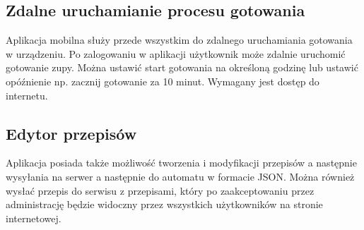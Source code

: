\documentclass[12pt,a4paper,notitlepage]{article}
\begin{document}
\subsection{Zdalne uruchamianie procesu gotowania}
Aplikacja mobilna służy przede wszystkim do zdalnego uruchamiania gotowania w urządzeniu. Po zalogowaniu w aplikacji użytkownik może zdalnie uruchomić gotowanie zupy. Można ustawić start gotowania na określoną godzinę lub ustawić opóźnienie np. zacznij gotowanie za 10 minut. Wymagany jest dostęp do internetu.
\subsection{Edytor przepisów}
Aplikacja posiada także możliwość tworzenia i modyfikacji przepisów a następnie wysyłania na serwer a następnie do automatu w formacie JSON. Można również wysłać przepis do serwisu z przepisami, który po zaakceptowaniu przez administrację będzie widoczny przez wszystkich użytkowników na stronie internetowej.
\end{document}

